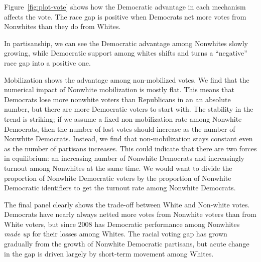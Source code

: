 \documentclass[12pt,]{article}
\theoremstyle{definition}
\theoremstyle{definition}
\theoremstyle{definition}
\theoremstyle{remark}
\begin{document}
Figure~\ref{fig:plot-vote} shows how the Democratic advantage in each
mechanism affects the vote. The race gap is positive when Democrats net
more votes from Nonwhites than they do from Whites.

In partisanship, we can see the Democratic advantage among Nonwhites
slowly growing, while Democratic support among whites shifts and turns a
``negative'' race gap into a positive one.

Mobilization shows the advantage among non-mobilized votes. We find that
the numerical impact of Nonwhite mobilization is mostly flat. This means
that Democrats lose more nonwhite voters than Republicans in an an
absolute number, but there are more Democratic voters to start with. The
stability in the trend is striking; if we assume a fixed
non-mobilization rate among Nonwhite Democrats, then the number of lost
votes should increase as the number of Nonwhite Democrats. Instead, we
find that non-mobilization stays constant even as the number of
partisans increases. This could indicate that there are two forces in
equilibrium: an increasing number of Nonwhite Democrats and increasingly
turnout among Nonwhites at the same time. We would want to divide the
proportion of Nonwhite Democratic voters by the proportion of Nonwhite
Democratic identifiers to get the turnout rate among Nonwhite Democrats.

The final panel clearly shows the trade-off between White and Non-white
votes. Democrats have nearly always netted more votes from Nonwhite
voters than from White voters, but since 2008 has Democratic performance
among Nonwhites \emph{made up} for their losses among Whites. The racial
voting gap has grown gradually from the growth of Nonwhite Democratic
partisans, but acute change in the gap is driven largely by short-term
movement among Whites.

\printbibliography
\end{document}
